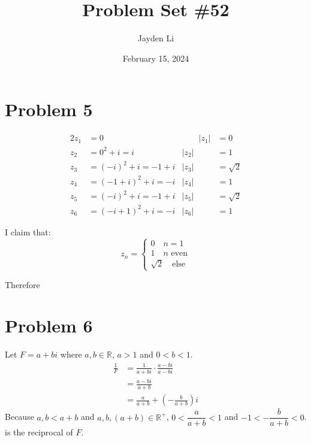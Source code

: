 \documentclass{article}
\title{Problem Set \#52}
\author{Jayden Li}
\date{February 15, 2024}
\begin{document}
\fontsize{12pt}{12pt}\selectfont
\setlength{\abovedisplayskip}{0pt}
\maketitle

\section*{Problem 5}

\begin{alignat*}{2}
	z_1&=0 &\qquad |z_1|&=0 \\
	z_2&=0^2+i=i & |z_2|&=1 \\
	z_3&=(-i)^2+i=-1+i & |z_3|&=\sqrt{2} \\
	z_4&=(-1+i)^2+i=-i & |z_4|&=1 \\
	z_5&=(-i)^2+i=-1+i & |z_5|&=\sqrt{2} \\
	z_6&=(-i+1)^2+i=-i & |z_6|&=1
\end{alignat*}

I claim that:
\begin{equation*}
	z_n=\begin{cases}
		0\quad n=1 \\
		1\quad\text{$n$ even} \\
		\sqrt{2}\quad\text{else}
	\end{cases}
\end{equation*}

Therefore 

\section*{Problem 6}
Let $F=a+bi$ where $a,b\in\mathbb{R}$, $a>1$ and $0<b<1$.
\begin{align*}
	\frac{1}{F}&=\frac{1}{a+bi}\cdot\frac{a-bi}{a-bi} \\
	&=\frac{a-bi}{a+b} \\
	&=\frac{a}{a+b}+\left(-\frac{b}{a+b}\right)i
\end{align*}
Because $a,b<a+b$ and $a,b,(a+b)\in\mathbb{R}^+$, $0<\dfrac{a}{a+b}<1$ and $-1<-\dfrac{b}{a+b}<0$.  is the reciprocal of $F$.
\end{document}
